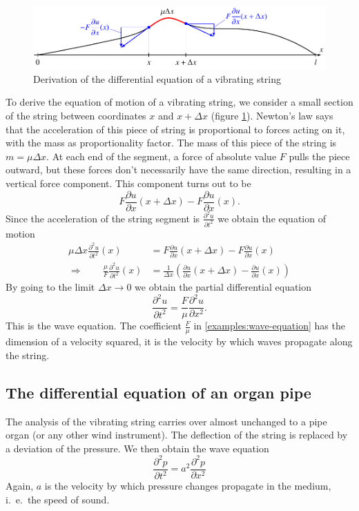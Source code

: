 \begin{figure}
\begin{center}
\includegraphics{1-examples/images/string.pdf}
\end{center}
\caption{Derivation of the differential equation of a vibrating string
\label{saite}}
\end{figure}
To derive the equation of motion of a vibrating string, we consider
a small section of the string between coordinates $x$ and $x+\Delta x$
(figure \ref{saite}).
Newton's law says that the acceleration of this piece of string 
is proportional to forces acting on it, with the mass as proportionality
factor.
The mass of this piece of the string is $m=\mu\Delta x$.
At each end of the segment, a force of absolute value $F$ pulls the piece
outward, but these forces don't necessarily have the same direction,
resulting in a vertical force component.
This component turns out to be
\[
F\frac{\partial u}{\partial x}(x+\Delta x)-F\frac{\partial u}{\partial x}(x).
\]
Since the acceleration of the string segment is
$\displaystyle\frac{\partial^2u}{\partial t^2}$
we obtain the equation of motion
\begin{align*}
\mu\Delta x\frac{\partial^2u}{\partial t^2}(x)&=
F\frac{\partial u}{\partial x}(x+\Delta x)-F\frac{\partial u}{\partial x}(x)\\
\Rightarrow\qquad
\frac{\mu}{F}\frac{\partial^2u}{\partial t^2}(x)&=
\frac1{\Delta x}\left(\frac{\partial u}{\partial x}(x+\Delta x)-\frac{\partial u}{\partial x}(x)\right)
\end{align*}
By going to the limit 
$\Delta x\to 0$ we obtain the partial differential equation
\begin{equation}
\frac{\partial^2u}{\partial t^2}=\frac{F}{\mu}\frac{\partial^2u}{\partial x^2}.
\label{examples:wave-equation}
\end{equation}
This is the wave equation.
The coefficient
$\frac{F}{\mu}$
in \eqref{examples:wave-equation}
has the dimension of a velocity squared, it is the velocity by which waves
propagate along the string.

\subsection{The differential equation of an organ pipe}
The analysis of the vibrating string carries over almost unchanged
to a pipe organ (or any other wind instrument).
The deflection of the string is replaced by a deviation of the pressure.
We then obtain the wave equation
\[
\frac{\partial^2p}{\partial t^2}=
a^2\frac{\partial^2p}{\partial x^2}
\]
Again, $a$ is the velocity by which pressure changes propagate in
the medium, i.~e.~the speed of sound.

